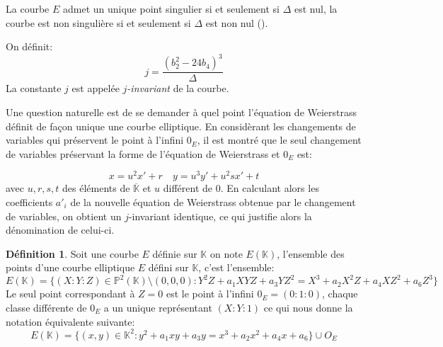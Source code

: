 \documentclass[10pt,a4paper]{book}
\theoremstyle{plain}
\theoremstyle{definition}
\theoremstyle{definition}
\theoremstyle{definition}
\theoremstyle{definition}
\newtheorem{defi}[thm]{Définition}
\theoremstyle{remark}
\theoremstyle{remark}
\theoremstyle{definition}
\begin{document}
La courbe $E$ admet un unique point singulier si et seulement si $\Delta$ est nul, la courbe est non singulière si et seulement si $\Delta$ est non nul (\cite[Prop. III.1.4]{Silv1}).



On définit: 
\begin{equation*}
j=\frac{(b_2^2-24b_4)^3}{\Delta}
\end{equation*}
La constante $j$ est appelée \emph{$j$-invariant} de la courbe.

Une question naturelle est de se demander à quel point l'équation de 
Weierstrass définit de façon unique une courbe elliptique. En considèrant les 
changements de variables qui préservent le point à l'infini $0_E$, il est 
montré \cite[III.3.1b]{Silv1} que le seul changement de variables préservant la
forme de l'équation de Weierstrass et $0_E$ est:

\begin{equation*}
x=u^2x'+r    \quad  y=u^3y'+u^2sx'+t
\end{equation*}
avec $u,r,s,t$ des éléments de $\overline{\mathbb{K}}$ et $u$ différent de $0$. En calculant alors les coefficients $a'_i$ de la nouvelle équation de Weierstrass obtenue par le changement de variables, on obtient un $j$-invariant identique, ce qui justifie alors la dénomination de celui-ci.
\newline


\begin{defi}
Soit une courbe $E$ définie sur $\mathbb{K}$ on note $E(\mathbb{K})$, l'ensemble des points d'une courbe elliptique $E$ défini sur $\mathbb{K}$, c'est l'ensemble:
\begin{equation*}
E(\mathbb{K})=\{(X:Y:Z)\in \mathbb{P}^2(\mathbb{K}) \setminus (0,0,0) : Y^2Z+a_1XYZ+a_3YZ^2=X^3+a_2X^2Z+a_4XZ^2+a_6Z^3 \}
\end{equation*}
Le seul point correspondant à $Z=0$ est le point à l'infini $0_E=(0:1:0)$, chaque classe différente de $0_E$ a un unique représentant $(X:Y:1)$ ce qui nous donne la notation équivalente suivante:
\begin{equation*}
E(\mathbb{K})=\{(x,y)\in \mathbb{K}^2  : y^2+a_1xy+a_3y=x^3+a_2x^2+a_4x+a_6 \} \cup {O_E}
\end{equation*}
\end{defi}
\end{document}
